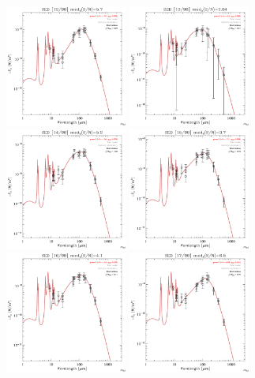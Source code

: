 \documentclass[preprint2,longabstract]{aastex}
\begin{document}
\begin{figure}
	\includegraphics[trim=0 2mm 0 0, clip, width=40mm]{SEDs/sed_12.pdf}
    \includegraphics[trim=0 2mm 0 0, clip, width=40mm]{SEDs/sed_13.pdf}
	\includegraphics[trim=0 2mm 0 0, clip, width=40mm]{SEDs/sed_14.pdf}
	\includegraphics[trim=0 2mm 0 0, clip, width=40mm]{SEDs/sed_15.pdf}
	\includegraphics[trim=0 2mm 0 0, clip, width=40mm]{SEDs/sed_16.pdf}
	\includegraphics[trim=0 2mm 0 0, clip, width=40mm]{SEDs/sed_17.pdf}

\end{figure}
\end{document}
